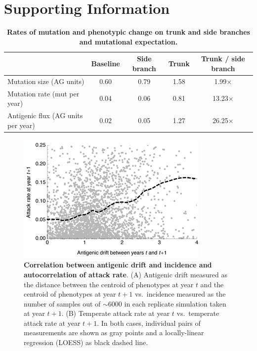 \documentclass[11pt,oneside,letterpaper]{article}
\begin{document}
\pagebreak

\section*{Supporting Information}

\setcounter{figure}{0}
\setcounter{table}{0}
\setcounter{page}{1}
\renewcommand{\thefigure}{S\arabic{figure}}
\renewcommand{\thetable}{S\arabic{table}}
\renewcommand{\thepage}{S\arabic{page}}

\vspace{1cm}

\begin{table}[H]
	\centering
	\caption{\textbf{Rates of mutation and phenotypic change on trunk and side branches and mutational expectation.}}
	\label{mktable}
	\begin{tabular}{ l c c c c } 
	\hline
		 								& Baseline 	& Side branch 	& Trunk		& Trunk / side branch \\
	\hline				
	Mutation size (AG units)			& 0.60		& 0.79			& 1.58		& 1.99$\times$ \\
	Mutation rate (mut per year)		& 0.04		& 0.06			& 0.81		& 13.23$\times$ \\	
	Antigenic flux (AG units per year)	& 0.02		& 0.05			& 1.27		& 26.25$\times$ \\		
	\hline
	\end{tabular}
\end{table}

\vspace{1cm}

\begin{figure}[H]
	\centering
	\includegraphics{figures/driftvsinc}
	\caption{\textbf{Correlation between antigenic drift and incidence and autocorrelation of attack rate}. (A) Antigenic drift measured as the distance between the centroid of phenotypes at year $t$ and the centroid of phenotypes at year $t+1$ vs.\ incidence measured as the number of samples out of $\sim6000$ in each replicate simulation taken at year $t+1$. (B) Temperate attack rate at year $t$ vs.\ temperate attack rate at year $t+1$. In both cases, individual pairs of measurements are shown as gray points and a locally-linear regression (LOESS) as black dashed line.}
	\label{driftvsinc}
\end{figure}
\end{document}

